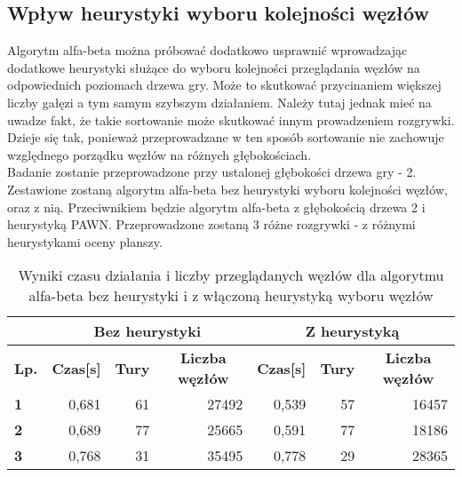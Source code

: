 \documentclass{article}
\begin{document}
	\subsection{Wpływ heurystyki wyboru kolejności węzłów}
	Algorytm alfa-beta można próbować dodatkowo usprawnić wprowadzając dodatkowe heurystyki służące do wyboru kolejności przeglądania węzłów na odpowiednich poziomach drzewa gry. Może to skutkować przycinaniem większej liczby gałęzi a tym samym szybszym działaniem. Należy tutaj jednak mieć na uwadze fakt, że takie sortowanie może skutkować innym prowadzeniem rozgrywki. Dzieje się tak, ponieważ przeprowadzane w ten sposób sortowanie nie zachowuje względnego porządku węzłów na różnych głębokościach.\\
	Badanie zostanie przeprowadzone przy ustalonej głębokości drzewa gry - 2. Zestawione zostaną algorytm alfa-beta bez heurystyki wyboru kolejności węzłów, oraz z nią. Przeciwnikiem będzie algorytm alfa-beta z głębokością drzewa 2 i heurystyką PAWN. Przeprowadzone zostaną 3 różne rozgrywki - z różnymi heurystykami oceny planszy.
	
	\begin{table}[H]
		\centering
		\label{tab:node_heuristics}
		\caption{Wyniki czasu działania i liczby przeglądanych węzłów dla algorytmu alfa-beta bez heurystyki i z włączoną heurystyką wyboru węzłów}
		\begin{tabular}{|l|r|r|r|r|r|r|}
			\hline
			\textbf{}                                 & \multicolumn{3}{c|}{\textbf{Bez heurystyki}}                                                                                 & \multicolumn{3}{c|}{\textbf{Z heurystyką}}                                                                                   \\ \hline
			\multicolumn{1}{|c|}{\textbf{Lp.}} & \multicolumn{1}{c|}{\textbf{Czas{[}s{]}}} & \multicolumn{1}{c|}{\textbf{Tury}} & \multicolumn{1}{c|}{\textbf{Liczba węzłów}} & \multicolumn{1}{c|}{\textbf{Czas{[}s{]}}} & \multicolumn{1}{c|}{\textbf{Tury}} & \multicolumn{1}{c|}{\textbf{Liczba węzłów}} \\ \hline
			\textbf{1}                             & 0,681                                     & 61                                 & 27492                                       & 0,539                                     & 57                                 & 16457                                       \\ \hline
			\textbf{2}                             & 0,689                                     & 77                                 & 25665                                       & 0,591                                     & 77                                 & 18186                                       \\ \hline
			\textbf{3}                             & 0,768                                     & 31                                 & 35495                                       & 0,778                                     & 29                                 & 28365                                       \\ \hline
		\end{tabular}
	\end{table}
\end{document}
